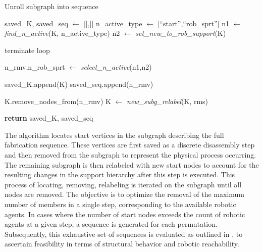         \begin{algorithm}
            \caption{Unroll subgraph into sequence}
            \label{alg:alg3_sequence}
            \begin{algorithmic}[1]
                \State saved\_K, saved\_seq $\gets$ [],[]
                \State n\_active\_type $\gets$ [``start'',``rob\_sprt'']
                \State
                    \State n1 $\gets$ \textit{find\_n\_active}(K, n\_active\_type)
                    \State n2 $\gets$ \textit{set\_new\_to\_rob\_support}(K)
                    
                    \State
                        \State terminate loop
                    \EndIf
                    
                    \State
                    \State n\_rmv,n\_rob\_sprt $\gets$ \textit{select\_n\_active}(n1,n2)

                    \State
                    \State saved\_K.append(K)
                    \State saved\_seq.append(n\_rmv)
                    
                    \State 
                    \State K.remove\_nodes\_from(n\_rmv)
                    \State K $\gets$ \textit{new\_subg\_relabel}(K, rms)

                \EndWhile
            \State \textbf{return} saved\_K, saved\_seq
            \EndProcedure
            \end{algorithmic}
        \end{algorithm}

        The algorithm locates start vertices in the subgraph describing the full fabrication sequence. These vertices are first saved as a discrete disassembly step and then removed from the subgraph to represent the physical process occurring. The remaining subgraph is then relabeled with new start nodes to account for the resulting changes in the support hierarchy after this step is executed. This process of locating, removing, relabeling is iterated on the subgraph until all nodes are removed. The objective is to optimize the removal of the maximum number of members in a single step, corresponding to the available robotic agents. In cases where the number of start nodes exceeds the count of robotic agents at a given step, a sequence is generated for each permutation. Subsequently, this exhaustive set of sequences is evaluated as outlined in , to ascertain feasibility in terms of structural behavior and robotic reachability.

